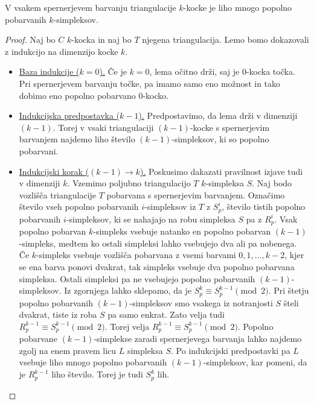 \documentclass[mat1]{fmfdelo}
\newcommand{\0}{\underline{0}}
\begin{document}
\begin{lema}\label{izr:kubsperner}
V vsakem spernerjevem barvanju triangulacije $k$-kocke je liho mnogo popolno pobarvanih $k$-simpleksov.
\end{lema}
\begin{proof}
Naj bo $C$ $k$-kocka in naj bo $T$ njegena triangulacija. Lemo bomo dokazovali z indukcijo na dimenzijo kocke $k$. 
\begin{itemize}
\item
\underline{Baza indukcije ($k = 0$).}
Če je $k=0$, lema očitno drži, saj je $0$-kocka točka. Pri spernerjevem barvanju točke, pa imamo samo eno možnost in tako dobimo eno popolno pobarvano $0$-kocko.
\item
\underline{Indukcijska predpostavka ($k - 1$).}
Predpostavimo, da lema drži v dimenziji $(k - 1)$. Torej v vsaki triangulaciji $(k - 1)$-kocke s spernerjevim barvanjem najdemo liho število $(k - 1)$-simpleksov, ki so popolno pobarvani. 
\item
\underline{Indukcijski korak ($(k - 1) \rightarrow k$).}
Poskusimo dakazati pravilnost izjave tudi v dimenziji $k$. Vzemimo poljubno triangulacijo $T$ $k$-simpleksa $S$. Naj bodo vozlišča triangulacije $T$ pobarvana s spernerjevim barvanjem. Označimo število vseh popolno pobarvanih $i$-simpleksov iz $T$ z $S_p^i$, število tistih popolno pobarvanih $i$-simpleksov, ki se nahajajo na robu simpleksa $S$ pa z $R_p^i$. Vsak popolno pobarvan $k$-simpleks vsebuje natanko en popolno pobarvan $(k-1)$-simpleks, medtem ko ostali simpleksi lahko vsebujejo dva ali pa nobenega. Če $k$-simpleks vsebuje vozlišča pobarvana z vsemi barvami $0, 1, \dots, k-2$, kjer se ena barva ponovi dvakrat, tak simpleks vsebuje dva popolno pobarvana simpleksa. Ostali simpleksi pa ne vsebujejo popolno pobarvanih $(k - 1)$-simpleksov. Iz zgornjega lahko sklepamo, da je $S_p^k \equiv S_p^{k-1} \pmod 2$. Pri štetju popolno pobarvanih $(k - 1)$-simpleksov smo vsakega iz notranjosti $S$ šteli dvakrat, tiste iz roba $S$ pa samo enkrat. Zato velja tudi $R_p^{k - 1} \equiv S_p^{k-1} \pmod 2$. Torej velja $R_p^{k - 1} \equiv S_p^{k-1} \pmod 2$. Popolno pobarvane $(k - 1)$-simplekse zaradi spernerjevega barvanja lahko najdemo zgolj na enem pravem licu $L$ simpleksa $S$. Po indukcijski predpostavki pa $L$ vsebuje liho mnogo popolno pobarvanih $(k - 1)$-simpleksov, kar pomeni, da je $R_p^{k - 1}$ liho število. Torej je tudi  $S_p^k$ lih.
\end{itemize}
\end{proof}
\end{document}
